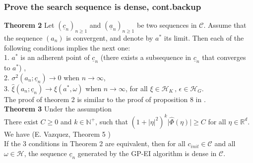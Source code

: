 \documentclass{beamer}
\let\oldcite=\cite
\renewcommand{\cite}[1]{\textcolor[rgb]{.4,.4,.85}{\oldcite{#1}}}
\begin{document}
\begin{frame}
    \frametitle{Prove the search sequence is dense, cont.\hfill \scriptsize{backup}}\small
    \textbf{Theorem 2} 
    Let $(\underline{c}_n)_{n\ge 1}$ and $(\underline{a}_n)_{n\ge 1}$ be two sequences in $\mathcal{C}$.
    Assume that the sequence $(a_n)$ is convergent, and denote by $a^*$ its limit. Then each of the
    following conditions implies the next one:\\
    1.  $a^*$ is an adherent point of $\underline{c}_n$ (there exists a subsequence in 
              $\underline{c}_n$ that converges to $a^*$) ,\\
    2.  $\sigma^2(a_n;\underline{c}_n)\rightarrow 0$  when $n\rightarrow \infty$,\\
    3.  $\hat{\xi}(a_n; \underline{c}_n) \rightarrow \xi(a^*, \omega)$ when $n\rightarrow \infty$,
              for all $\xi \in \mathcal{H}_K\,,\, \epsilon \in \mathcal{H}_G$.\\
    \vspace{.2cm}
    The proof of theorem 2 is similar to the proof of proposition 8 in \cite{Vazquez 10}.\\
    \vspace{.3cm}
    \textbf{Theorem 3}
    Under the assumption \\
    There exist $C\ge 0$ and $k \in\mathbb{N}^+$, such that 
    $(1+|\eta|^2)^k \big|\hat{\Phi}(\eta)\big|\ge C$ for all $\eta\in \mathbb{R}^d$.\\
    We have
   (E. Vazquez, Theorem 5 \cite{Vazquez 10})\\
   If the 3 conditions in Theorem 2 
   are equivalent, then for all $c_{init}\in \mathcal{C}$ and all $\omega \in \mathcal{H}$, the sequence 
   $\underline{c}_n$ generated by the GP-EI algorithm is dense in $\mathcal{C}$.
\end{frame}
\end{document}
